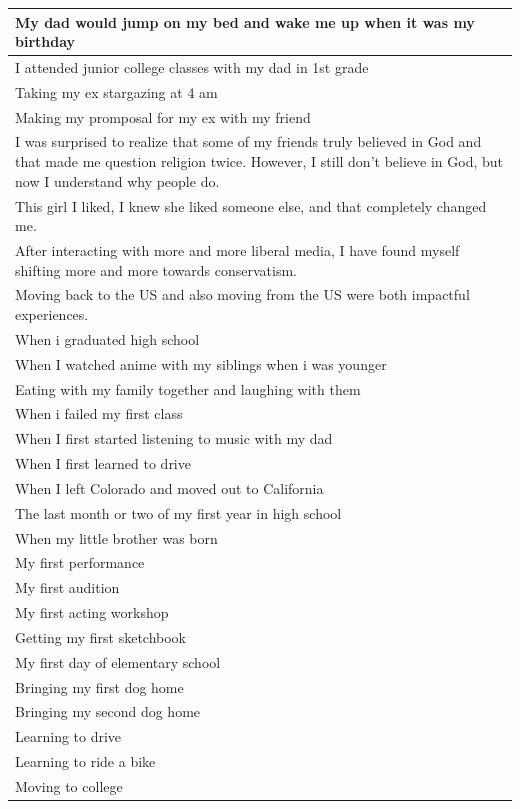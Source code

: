 \documentclass[
  .7em,
  letterpaper,
  DIV=11,
  numbers=noendperiod]{scrartcl}
\begin{document}
\begin{table}
\begin{tabular}{l}
\hline
My dad would jump on my bed and wake me up when it was my birthday\\
\hline
I attended junior college classes with my dad in 1st grade\\
\hline
Taking my ex stargazing at 4 am\\
\hline
Making my promposal for my ex with my friend\\
\hline
I was surprised to realize that some of my friends truly believed in God and that made me question religion twice. However, I still don't believe in God, but now I understand why people do.\\
\hline
This girl I liked, I knew she liked someone else, and that completely changed me.\\
\hline
After interacting with more and more liberal media, I have found myself shifting more and more towards conservatism.\\
\hline
Moving back to the US and also moving from the US were both impactful experiences.\\
\hline
When i graduated high school\\
\hline
When I watched anime with my siblings when i was younger\\
\hline
Eating with my family together and laughing with them\\
\hline
When i failed my first class\\
\hline
When I first started listening to music with my dad\\
\hline
When I first learned to drive\\
\hline
When I left Colorado and moved out to California\\
\hline
The last month or two of my first year in high school\\
\hline
When my little brother was born\\
\hline
My first performance\\
\hline
My first audition\\
\hline
My first acting workshop\\
\hline
Getting my first sketchbook\\
\hline
My first day of elementary school\\
\hline
Bringing my first dog home\\
\hline
Bringing my second dog home\\
\hline
Learning to drive\\
\hline
Learning to ride a bike\\
\hline
Moving to college\\

\end{tabular}
\end{table}
\end{document}
